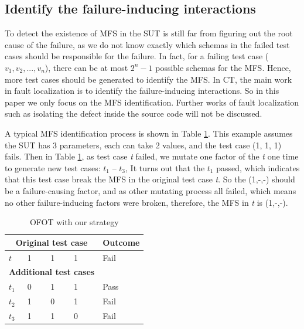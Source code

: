 \documentclass{sig-alternate}
\begin{document}
\subsection{Identify the failure-inducing interactions}
To detect the existence of MFS in the SUT is still far from figuring out the root cause of the failure, as we do not know exactly which schemas in the failed test cases should be responsible for the failure. In fact, for a failing test case ($v_{1},v_{2},...,v_{n}$), there can be at most $2^{n} - 1$ possible schemas for the MFS. Hence, more test cases should be generated to identify the MFS. In CT, the main work in fault localization is to identify the failure-inducing interactions. So in this paper we only focus on the MFS identification. Further works of fault localization such as isolating the defect inside the source code will not be discussed.

A typical MFS identification process is shown in Table \ref{ofot-identify}. This example assumes the SUT has 3 parameters, each can take 2 values, and the test case (1, 1, 1) fails. Then in Table \ref{ofot-identify}, as test case \emph{t} failed, we mutate one factor of the \emph{t} one time to generate new test cases: $t_{1}$ -- $t_{3}$, It turns out that the $t_{1}$ passed, which indicates that this test case break the MFS in the original test case \emph{t}. So the (1,-,-) should be a failure-causing factor, and as other mutating process all failed, which means no other failure-inducing factors were broken, therefore, the MFS in \emph{t} is (1,-,-).

\begin{table}[h]
\caption{OFOT with our strategy}
\label{ofot-identify}
\center
\begin{tabular}{llllll}
 \hline
\multicolumn{5}{c}{\bfseries Original test case} & \bfseries Outcome \\  \hline
 $t$ & \multicolumn{4}{l}{1 \ \ \ \ 1 \ \ \ \  1 } & Fail \\
 \hline
\multicolumn{5}{c}{\bfseries Additional  test cases} &  \\  \hline
$t_{1}$ &\multicolumn{4}{l}{0  \ \ \ \  1 \ \ \ \  1 }& Pass \\
$t_{2}$ &\multicolumn{4}{l}{1  \ \ \ \  0 \ \ \ \  1 } & Fail \\
$t_{3}$ &\multicolumn{4}{l}{1  \ \ \ \  1 \ \ \ \  0 } & Fail \\
 \hline
\end{tabular}
\end{table}
\end{document}
